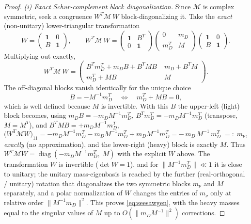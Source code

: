 \documentclass[12pt]{article}
\theoremstyle{definition}
\begin{document}
\begin{proof}
\smallskip
\emph{(i) Exact Schur-complement block diagonalization.}
Since $\mathcal M$ is complex symmetric, seek a congruence
$W^T\mathcal M\,W$ block-diagonalizing it. Take the \emph{exact}
(non-unitary) lower-triangular transformation
\[
W=\begin{pmatrix}\mathbf 1 & 0\\ B & \mathbf 1\end{pmatrix},
\qquad
W^T\mathcal M\,W
=\begin{pmatrix}\mathbf1 & B^T\\ 0 & \mathbf1\end{pmatrix}
\begin{pmatrix}0 & m_D\\ m_D^T & M\end{pmatrix}
\begin{pmatrix}\mathbf1 & 0\\ B & \mathbf1\end{pmatrix}.
\]
Multiplying out exactly,
\[
W^T\mathcal M\,W=
\begin{pmatrix}
B^Tm_D^T+m_DB+B^TMB & \; m_D+B^TM\\[2pt]
m_D^T+MB & \; M
\end{pmatrix}.
\]
The off-diagonal blocks vanish identically for the unique choice
\begin{equation}\label{eq:Bchoice}
B=-M^{-1}m_D^T \quad\Longleftrightarrow\quad m_D^T+MB=0 ,
\end{equation}
which is well defined because $M$ is invertible. With this $B$ the
upper-left (light) block becomes, using $m_DB=-m_DM^{-1}m_D^T$,
$B^Tm_D^T=-m_DM^{-1}m_D^T$ (transpose, $M=M^T$), and
$B^TMB=+m_DM^{-1}m_D^T$,
\begin{equation}\label{eq:lightexact}
\big(W^T\mathcal M W\big)_{11}
= -m_DM^{-1}m_D^T - m_DM^{-1}m_D^T + m_DM^{-1}m_D^T
= -\,m_D\,M^{-1}\,m_D^T \;=:\; m_\nu ,
\end{equation}
\emph{exactly} (no approximation), and the lower-right (heavy) block is
exactly $M$. Thus
$W^T\mathcal M W=\operatorname{diag}(-m_DM^{-1}m_D^T,\;M)$ with the explicit
$W$ above. The transformation $W$ is invertible
($\det W=1$), and for $\|M^{-1}m_D^T\|\ll1$ it is close to unitary; the
unitary mass-eigenbasis is reached by the further (real-orthogonal /
unitary) rotation that diagonalizes the two symmetric blocks $m_\nu$ and
$M$ separately, and a polar normalization of $W$ changes
the entries of $m_\nu$ only at relative order $\|M^{-1}m_D\|^2$. This
proves \eqref{eq:seesawgen}, with the heavy masses equal to the singular
values of $M$ up to $O(\|m_DM^{-1}\|^2)$ corrections.


\end{proof}
\end{document}
